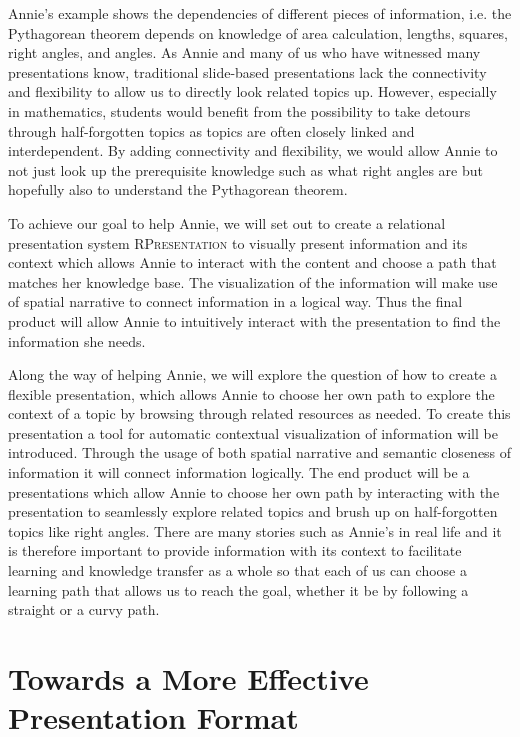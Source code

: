 \documentclass{llncs}
\newcommand{\sys}{\textsc{RPresentation}\xspace}
\begin{document}
Annie's example shows the dependencies of different pieces of information, i.e. the Pythagorean theorem depends on knowledge of area calculation, lengths, squares, right angles, and angles. As Annie and many of us who have witnessed many presentations know, traditional slide-based presentations lack the connectivity and flexibility to allow us to directly look related topics up. However, especially in mathematics, students would benefit from the possibility to take detours through half-forgotten topics as topics are often closely linked and interdependent. By adding connectivity and flexibility, we would allow Annie to not just look up the prerequisite knowledge such as what right angles are but hopefully also to understand the Pythagorean theorem.

To achieve our goal to help Annie, we will set out to create a relational presentation system \sys to visually present information and its context which allows Annie to interact with the content and choose a path that matches her knowledge base. The visualization of the information will make use of spatial narrative to connect information in a logical way. Thus the final product will allow Annie to intuitively interact with the presentation to find the information she needs.

Along the way of helping Annie, we will explore the question of how to create a flexible presentation, which allows Annie to choose her own path to explore the context of a topic by browsing through related resources as needed. To create this presentation a tool for automatic contextual visualization of information will be introduced. Through the usage of both spatial narrative and semantic closeness of information it will connect information logically. The end product will be a presentations which allow Annie to choose her own path by interacting with the presentation to seamlessly explore related topics and brush up on half-forgotten topics like right angles. There are many stories such as Annie's in real life and it is therefore important to provide information with its context to facilitate learning and knowledge transfer as a whole so that each of us can choose a learning path that allows us to reach the goal, whether it be by following a straight or a curvy path.

\section{Towards a More Effective Presentation Format}
\label{sec:TowardsAMoreEffectivePresentationFormat}
\end{document}
